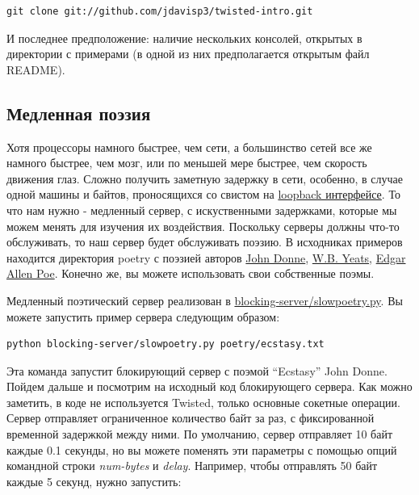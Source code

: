 \begin{scriptsize}\begin{verbatim}
git clone git://github.com/jdavisp3/twisted-intro.git
\end{verbatim}\end{scriptsize}

И последнее предположение: наличие нескольких консолей, 
открытых в директории с примерами (в одной из них предполагается 
открытым файл README).


\subsection{Медленная поэзия}


    Хотя процессоры намного быстрее, чем сети, 
а большинство сетей все же намного быстрее, чем мозг, 
или по меньшей мере быстрее, чем скорость движения 
глаз. Сложно получить заметную задержку в сети, особенно, в случае 
одной машины и байтов, проносящихся со свистом на  
\href{http://en.wikipedia.org/wiki/Loopback}{loopback интерфейсе}. 
То что нам нужно - медленный сервер, 
с искуственными задержками, которые мы можем менять для 
изучения их воздействия. Поскольку серверы должны что-то 
обслуживать, то наш сервер будет обслуживать поэзию. 
В исходниках примеров находится директория poetry с поэзией авторов 
\href{http://en.wikipedia.org/wiki/Donne}{John Donne},
\href{http://en.wikipedia.org/wiki/Yeats}{W.B. Yeats}, 
\href{http://en.wikipedia.org/wiki/Poe}{Edgar Allen Poe}. 
Конечно же, вы можете использовать свои собственные поэмы. 


Медленный поэтический сервер реализован в 
\href{http://github.com/jdavisp3/twisted-intro/blob/master/blocking-server/slowpoetry.py}{blocking-server/slowpoetry.py}. 
Вы можете запустить пример сервера следующим образом:

\begin{scriptsize}\begin{verbatim}
python blocking-server/slowpoetry.py poetry/ecstasy.txt
\end{verbatim}\end{scriptsize}


Эта команда запустит блокирующий сервер с 
поэмой “Ecstasy” John Donne. Пойдем дальше и посмотрим на 
исходный код блокирующего сервера. Как можно заметить, в 
коде не используется Twisted, только основные сокетные 
операции. Сервер отправляет ограниченное количество 
байт за раз, с фиксированной временной задержкой между ними. 
По умолчанию, сервер отправляет 10 байт каждые 0.1 секунды, 
но вы можете поменять эти параметры с помощью опций 
командной строки \textit{num-bytes} и 
\textit{delay}. Например, чтобы 
отправлять 50 байт каждые 5 секунд, нужно запустить: 

